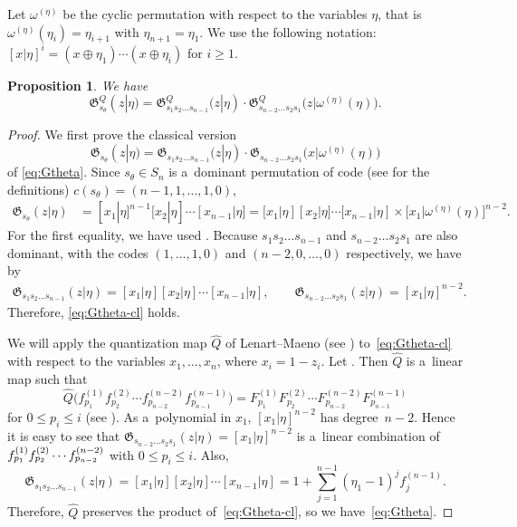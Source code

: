 \documentclass[pdftex]{sigma}
\numberwithin{equation}{section}
\newcommand{\Gro}[1]{\mathfrak{G}^Q_{#1}}
\newtheorem{Proposition}[Theorem]{Proposition}
\theoremstyle{definition}
\begin{document}
Let $\omega^{(\eta)}$ be the cyclic permutation with respect to the variables $\eta$, that is
$\omega^{(\eta)}(\eta_i)=\eta_{i+1}$
with $\eta_{n+1}=\eta_1$.
We use the following notation:
$
[x|\eta]^i=(x\oplus \eta_1)\cdots (x\oplus \eta_i)
$
for $i\ge 1$.
\begin{Proposition}
\label{prop:Gtheta}
We have
\begin{equation}
\Gro{s_\theta}(z|\eta)=\Gro{s_1s_2\dots s_{n-1}}(z|\eta)\cdot \Gro{s_{n-2}\dots s_2s_1}\bigl(z|\omega^{(\eta)}(\eta)\bigr)\label{eq:Gtheta}
.
\end{equation}
\end{Proposition}
\begin{proof}
We first prove
the classical version
\begin{equation}
\mathfrak{G}_{s_\theta}(z|\eta)=\mathfrak{G}_{s_1s_2\dots s_{n-1}}(z|\eta)\cdot \mathfrak{G}_{s_{n-2}\dots s_2s_1}\bigl(x|\omega^{(\eta)}(\eta)\bigr)
\label{eq:Gtheta-cl}
\end{equation}
of
\eqref{eq:Gtheta}.
Since
$s_\theta\in S_n$ is a~dominant permutation of
code (see \cite[Chapter~I]{Mac} for the definitions) $c(s_\theta)=(n-1,1,\dots,1,0)$,
\begin{align*}
\mathfrak{G}_{s_\theta}(z|\eta)&=
[x_1|\eta]^{n-1}
[x_2|\eta]
\cdots
[x_{n-1}| \eta]=[x_1|\eta]
[x_2|\eta]
\cdots
[x_{n-1}| \eta]\times
\big[x_1|\omega^{(\eta)}(\eta)\big]^{n-2}.
\end{align*}
For the first equality, we have used \cite[Lemma B.6]{MNS1}.
Because
$s_1s_2\dots s_{n-1}$
and $s_{n-2}\dots s_{2}s_1$
are also dominant, with the codes
$(1,\dots,1,0)$ and $ (n-2,0,\dots,0)$
respectively, we have by \cite[Lemma B.6]{MNS1}
\begin{gather*}%
\mathfrak{G}_{s_1s_2\dots s_{n-1}}(z|\eta)
=[x_1|\eta]
[x_2|\eta]
\cdots
[x_{n-1}| \eta],\qquad
\mathfrak{G}_{s_{n-2}\dots s_{2}s_1}(z|\eta)
=[x_1|\eta]^{n-2}.
\end{gather*}
Therefore, \eqref{eq:Gtheta-cl} holds.

We will apply the quantization map
$\hat{Q}$ of Lenart--Maeno (see \cite[Section~3]{LM}) to~\eqref{eq:Gtheta-cl} with respect to the variables
$x_1,\dots,x_n$, where $x_i=1-z_i$.
Let . Then
$\hat{Q}$ is a~linear map such that
\[\hat{Q}\bigl(f_{p_1}^{(1)}f_{p_2}^{(2)}\cdots f_{p_{n-2}}^{(n-2)}f_{p_{n-1}}^{(n-1)}\bigr)=F_{p_1}^{(1)}F_{p_2}^{(2)}\cdots F_{p_{n-2}}^{(n-2)}F_{p_{n-1}}^{(n-1)}
\]
for $0\le p_i\le i$ (see \cite[Proposition 3.16]{LM}).
As a~polynomial in $x_1$, $[x_1|\eta]^{n-2}$
has degree~${n-2}$.
Hence it is easy to see that
$\mathfrak{G}_{s_{n-2}\dots s_{2}s_1}(z|\eta)=[x_1|\eta]^{n-2}$
is a~linear combination of
$\smash{f_{p_1}^{(1)}f_{p_2}^{(2)}}\cdots\allowbreak\smash{ f_{p_{n-2}}^{(n-2)}}$ with $ 0\le p_i\le i$.
Also,
\begin{equation}
\mathfrak{G}_{s_{1}s_2\dots s_{n-1}}(z|\eta)=[x_1|\eta]
[x_2|\eta]
\cdots
[x_{n-1}| \eta]=
1+\sum_{j=1}^{n-1}
(\eta_1-1)^jf_j^{(n-1)}.
\label{eq:phi_(n-1)-2}
\end{equation}
Therefore,
$\hat{Q}$ preserves the product of~\eqref{eq:Gtheta-cl},
so we have~\eqref{eq:Gtheta}.
\end{proof}
\end{document}

